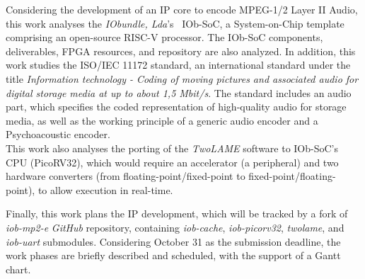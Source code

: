 Considering the development of an IP core to encode MPEG-1/2 Layer II Audio, this work analyses the \textit{IObundle, Lda}'s~\cite{iobundle} IOb-SoC, a System-on-Chip template comprising an open-source RISC-V processor. The IOb-SoC components, deliverables, FPGA resources, and repository are also analyzed. 
In addition, this work studies the ISO/IEC 11172 standard, an international standard under the title \textit{Information technology - Coding of moving pictures and associated audio for digital storage media at up to about 1,5 Mbit/s}. The standard includes an audio part, which specifies the coded representation of high-quality audio for storage media, as well as the working principle of a generic audio encoder and a Psychoacoustic encoder.\\
This work also analyses the porting of the \textit{TwoLAME} software to IOb-SoC's CPU (PicoRV32), which would require an accelerator (a peripheral) and two hardware converters (from floating-point/fixed-point to fixed-point/floating-point), to allow execution in real-time.

Finally, this work plans the IP development, which will be tracked by a fork of \textit{iob-mp2-e} \textit{GitHub} repository, containing \textit{iob-cache}, \textit{iob-picorv32}, \textit{twolame}, and \textit{iob-uart} submodules.
Considering October 31 as the submission deadline, the work phases are briefly described and scheduled, with the support of a Gantt chart. 

